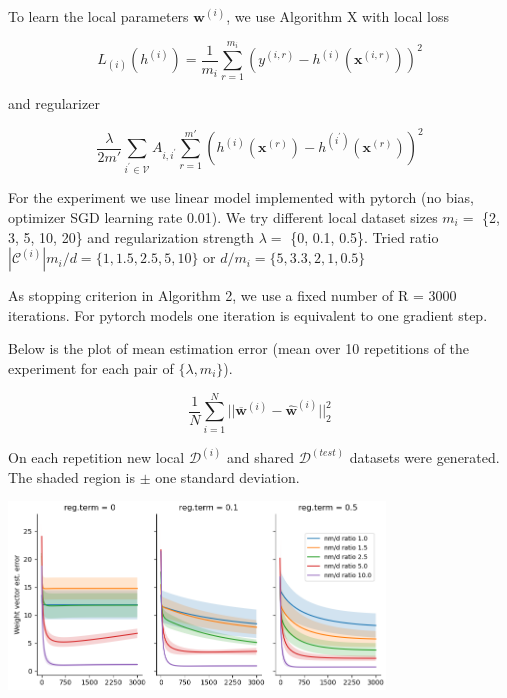 \documentclass{article}
\begin{document}
To learn the local parameters $\mathbf{w}^{(i)}$, we use Algorithm X with local loss 

\begin{equation}
{L}_{(i)}({h}^{(i)}) = \frac{1}{{m}_{i}} \sum_{r=1}^{{m}_{i}}\left({y}^{(i,r)} - {h}^{(i)}(\mathbf{x}^{(i,r)}) \right)^2
\end{equation}

and  regularizer 

\begin{equation}
\frac{\lambda}{2m'} \sum_{{i}^{'} \in {\mathcal V}} {A}_{i,{i}^{'}} \sum_{r=1}^{m'} \left({h}^{(i)}(\mathbf{x}^{(r)}) - {h}^{({i}^{'})}(\mathbf{x}^{(r)}) \right)^2
\end{equation}

For the experiment we use linear model implemented with pytorch (no bias, optimizer SGD learning rate 0.01). We try different local dataset sizes $m_i =$ \{2, 3, 5, 10, 20\} and regularization strength $\lambda =$ \{0, 0.1, 0.5\}. Tried ratio $|\mathcal{C}^{(i)}|m_i / d = \{1, 1.5, 2.5, 5, 10\}$ or $d / m_i = \{5, 3.3, 2, 1, 0.5\}$ 

As stopping criterion in Algorithm 2, we use a fixed number of R = 3000 iterations. 
For pytorch models one iteration is equivalent to one gradient step.

Below is the plot of mean estimation error (mean over 10 repetitions of the experiment for each pair of $\{\lambda, m_i \}$).

\begin{equation}
\frac{1}{N} \sum_{i=1}^{N} ||\mathbf{\overline{w}}^{(i)} - \mathbf{\widehat{w}}^{(i)}||^2_2
\end{equation}

On each repetition new local $\mathcal{D}^{(i)}$ and shared $\mathcal{D}^{(test)}$ datasets were generated. The shaded region is $\pm$ one standard deviation.  

\includegraphics[width=10cm]{linreg_with_G.png}
\end{document}
